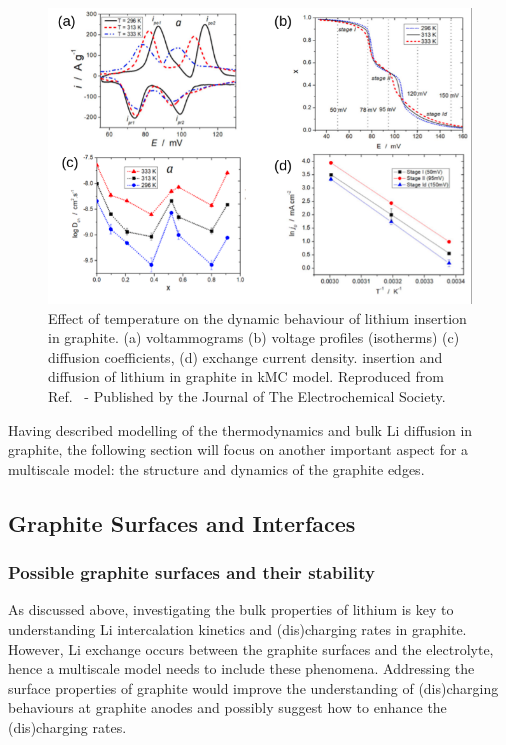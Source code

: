 \documentclass[../main.tex]{subfiles}
\begin{document}
\begin{figure}
    \centering
    \includegraphics[scale=2]{figures/kmc_observables.png}
    \caption{Effect of temperature on the dynamic behaviour of lithium insertion in graphite. (a) voltammograms (b) voltage profiles (isotherms) (c) diffusion coefficients, (d) exchange current density. insertion and diffusion of lithium in graphite in kMC model. Reproduced from Ref.~ - Published by the Journal of The Electrochemical Society.}
    \label{fig:graphite_kmcobservables}
\end{figure}

Having described modelling of the thermodynamics and bulk Li diffusion in graphite, the following section will focus on another important aspect for a multiscale model: the structure and dynamics of the graphite edges.

\subsection{Graphite Surfaces and Interfaces}
\label{sec:anodes_surfaces_interfaces}

\subsubsection{Possible graphite surfaces and their stability}
As discussed above, investigating the bulk properties of lithium is key to understanding Li intercalation kinetics and (dis)charging rates in graphite. However, Li exchange occurs between the graphite surfaces and the electrolyte, hence a multiscale model needs to include these phenomena. Addressing the surface properties of graphite would improve the understanding of (dis)charging behaviours at graphite anodes and possibly suggest how to enhance the (dis)charging rates.
\end{document}
